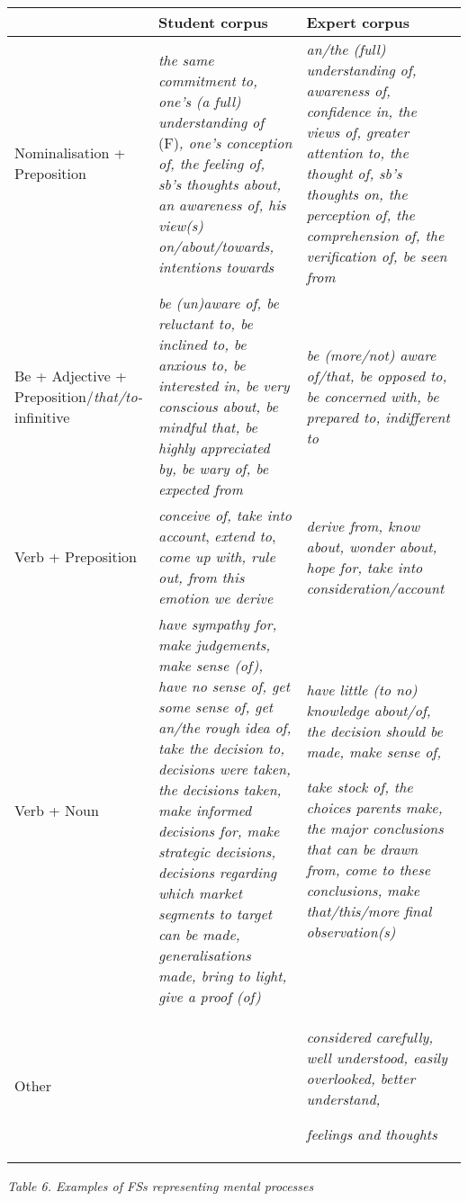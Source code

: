 \documentclass[12pt]{article}
\newenvironment{styleStandard}{\setlength\leftskip{0cm}\setlength\rightskip{0cm plus 1fil}\setlength\parindent{0cm}\setlength\parfillskip{0pt plus 1fil}\setlength\parskip{0cm plus 1pt}\writerlistparindent\writerlistleftskip\leavevmode\normalfont\normalsize\writerlistlabel\ignorespaces}{\unskip\vspace{0cm plus 1pt}\par}
\newcommand\writerlistleftskip{}
\newcommand\writerlistparindent{}
\newcommand\writerlistlabel{}
\begin{document}
\begin{center}
\tablefirsthead{}
\tablehead{}
\tabletail{}
\tablelasttail{}
\begin{supertabular}{m{1.3670598in}m{1.5538598in}m{1.5629599in}}
\hline
 &
Student corpus &
Expert corpus\\\hline
Nominalisation + Preposition &
\textit{the same commitment to, one’s (a full) understanding of }(F)\textit{, one’s conception of, the feeling of, sb’s thoughts about, an awareness of, his view(s) on/about/towards, intentions towards} &
\textit{an/the (full) understanding of, awareness of, confidence in, the views of, greater attention to, the thought of, sb’s thoughts on, the perception of, the comprehension of, the verification of, be seen from}\\\hline
Be + Adjective + Preposition/\textit{that/to-}infinitive &
\textit{be (un)aware of, be reluctant to, be inclined to, be anxious to, be interested in, be very conscious about, be mindful that, be highly appreciated by, be wary of, be expected from} &
\textit{be (more/not) aware of/that, be opposed to, be concerned with, be prepared to, indifferent to}\\\hline
Verb + Preposition  &
\textit{conceive of, take into account}, \textit{extend to}, \textit{come up with, rule out, from this emotion we derive} &
\textit{derive from, know about, wonder about, hope for, take into consideration/account}\\\hline
Verb + Noun &
\textit{have sympathy for, make judgements, make sense (of), have no sense of, get some sense of, get an/the rough idea of, take the decision to, decisions were taken, the decisions taken, make informed decisions for, make strategic decisions, decisions regarding which market segments to target can be made, generalisations made, bring to light, give a proof (of)} &
\textit{have little (to no) knowledge about/of, the decision should be made, make sense of,}

\textit{take stock of, the choices parents make, the major conclusions that can be drawn from, come to these conclusions, make that/this/more final observation(s)}\\\hline
Other &
 &
\textit{considered carefully, well understood, easily overlooked, better understand,}

\textit{feelings and thoughts}\\\hline
\end{supertabular}
\end{center}
\begin{styleStandard}
\textit{Table 6. Examples of FSs representing mental processes}
\end{styleStandard}
\end{document}
